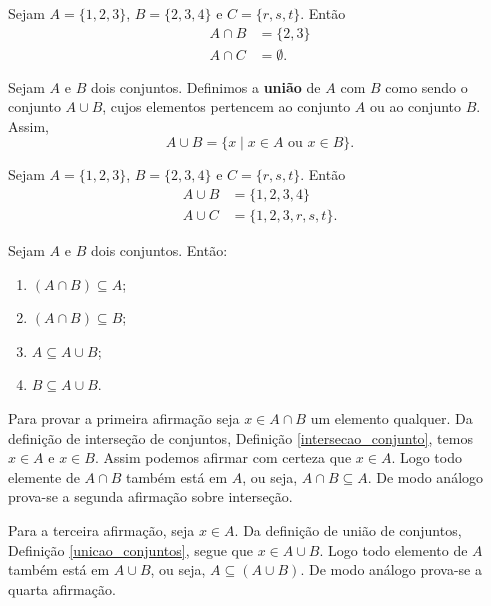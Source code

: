 \begin{exemplo}
	Sejam $A = \{1, 2, 3\}$, $B = \{2, 3, 4\}$ e $C = \{r, s, t\}$. Então
	\begin{align*}
		A \cap B &= \{2, 3\}\\
		A \cap C &= \emptyset.
	\end{align*}
\end{exemplo}

\begin{definicao}\label{unicao_conjuntos}
Sejam $A$ e $B$ dois conjuntos. Definimos a \textbf{uni{\~a}o} de $A$ com $B$ como sendo o conjunto $A \cup B$, cujos elementos pertencem ao conjunto $A$ ou ao conjunto $B$. Assim,
\[
A \cup B = \{x \mid x \in A \mbox{ ou } x \in B\}.
\]
\end{definicao}

\begin{exemplo}
	Sejam $A = \{1, 2, 3\}$, $B = \{2, 3, 4\}$ e $C = \{r, s, t\}$. Então
	\begin{align*}
		A \cup B &= \{1,2,3,4\}\\
		A \cup C &= \{1,2,3,r,s,t\}.
	\end{align*}
\end{exemplo}

\begin{proposicao} Sejam $A$ e $B$ dois conjuntos. Ent{\~a}o:
	\begin{enumerate}[label={\roman*})]
		\item $(A \cap B) \subseteq A$;
		\item $(A \cap B) \subseteq B$;
		\item $A \subseteq A \cup B$;
		\item $B \subseteq A \cup B$.
	\end{enumerate}
\end{proposicao}
\begin{prova}
	Para provar a primeira afirmação seja $x \in A \cap B$ um elemento qualquer. Da defini\c{c}\~ao de interse\c{c}\~ao de conjuntos, Definição \ref{intersecao_conjunto}, temos $x \in A$ e $x \in B$. Assim podemos afirmar com certeza que $x \in A$. Logo todo elemente de $A \cap B$ também está em $A$, ou seja, $A \cap B \subseteq A$. De modo análogo prova-se a segunda afirmação sobre interseção.

	Para a terceira afirmação, seja $x \in A$. Da definição de união de conjuntos, Definição \ref{unicao_conjuntos}, segue que $x \in A \cup B$. Logo todo elemento de $A$ também está em $A \cup B$, ou seja, $A \subseteq (A \cup B)$. De modo análogo prova-se a quarta afirmação.
\end{prova}

